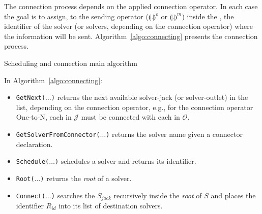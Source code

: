 The connection process depends on the applied connection operator. In each case the goal is to assign, to the sending operator ($\llparenthesis .\rrparenthesis^{o}$ or $\llparenthesis .\rrparenthesis^{m}$) inside the \as{}, the identifier of the solver (or solvers, depending on the connection operator) where the information will be sent. Algorithm~\ref{algo:connecting} presents the connection process.

\incmargin{1.4em}
\linesnumbered
\begin{algorithm}[H]
\dontprintsemicolon
\SetLine
{}

{}
\caption{Scheduling and connection main algorithm}\label{algo:connecting}
\end{algorithm}

In Algorithm~\ref{algo:connecting}:
\begin{itemize}
\item \texttt{GetNext($\dots$)} returns the next available solver-jack (or solver-outlet) in the list, depending on the connection operator, e.g., for the connection operator One-to-N, each \jack{} in $\mathcal{J}$ must be connected with each \outlet{} in $\mathcal{O}$.
\item \texttt{GetSolverFromConnector($\dots$)} returns the solver name given a connector declaration.
\item \texttt{Schedule($\dots$)} schedules a solver and returns its identifier.
\item \texttt{Root($\dots$)} returns the {\it root} \cm{} of a solver.
\item \texttt{Connect($\dots$)} %
searches the \om{} $S_{jack}$ recursively inside the {\it root} \cm{} of $S$ and places the identifier $R_{id}$ into its list of destination solvers.
\end{itemize}

